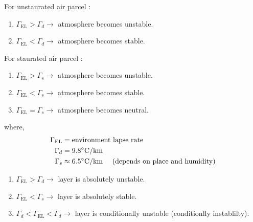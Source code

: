 \documentclass[fleqn,10pt]{SelfArx} %
\begin{document}
For unstaurated air parcel :
\begin{enumerate}[noitemsep]
    \item $\Gamma_{\text{EL}} > \Gamma_d \rightarrow$ atmosphere becomes unstable.
    \item $\Gamma_{\text{EL}} < \Gamma_d \rightarrow$ atmosphere becomes stable.
\end{enumerate}
For staurated air parcel :
\begin{enumerate}[noitemsep]
    \item $\Gamma_{\text{EL}} > \Gamma_s \rightarrow$ atmosphere becomes unstable.
    \item $\Gamma_{\text{EL}} < \Gamma_s \rightarrow$ atmosphere becomes stable.
    \item $\Gamma_{\text{EL}} = \Gamma_s \rightarrow$ atmosphere becomes neutral.
\end{enumerate}

where,\vspace{-0.2cm}
\begin{align*}
    \Gamma_{\text{EL}} &= \text{environment lapse rate} \\
    \Gamma_d &= 9.8^{\circ}\text{C/km} \\
    \Gamma_s &\approx 6.5^{\circ}\text{C/km \quad (depends on place and humidity)}
\end{align*}
\begin{enumerate}[noitemsep]
    \item $\Gamma_{\text{EL}} > \Gamma_d \rightarrow$ layer is absolutely unstable.
    \item $\Gamma_{\text{EL}} < \Gamma_s \rightarrow$ layer is absolutely stable.
    \item $\Gamma_d < \Gamma_{\text{EL}} < \Gamma_d \rightarrow$ layer is conditionally unstable (conditionlly instablilty).
\end{enumerate}
\end{document}
